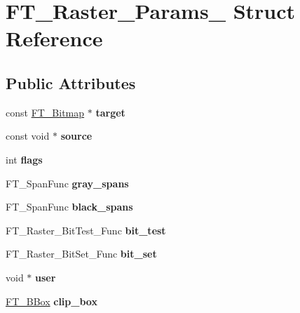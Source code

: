 \hypertarget{struct_f_t___raster___params__}{}\section{F\+T\+\_\+\+Raster\+\_\+\+Params\+\_\+ Struct Reference}
\label{struct_f_t___raster___params__}
\subsection*{Public Attributes}
\begin{DoxyCompactItemize}
\item 
\mbox{\label{struct_f_t___raster___params___a2ba8941740db23ec91302aa9bd154da3}} 
const \hyperlink{struct_f_t___bitmap__}{F\+T\+\_\+\+Bitmap} $\ast$ {\bfseries target}
\item 
\mbox{\label{struct_f_t___raster___params___a9be95865384791b018f7a9665a062ee5}} 
const void $\ast$ {\bfseries source}
\item 
\mbox{\label{struct_f_t___raster___params___a1a28ab69b8296b4378886d1a2b57d333}} 
int {\bfseries flags}
\item 
\mbox{\label{struct_f_t___raster___params___a456191f1944775933e3d9d36c8632c35}} 
F\+T\+\_\+\+Span\+Func {\bfseries gray\+\_\+spans}
\item 
\mbox{\label{struct_f_t___raster___params___a42c30e60ad5e243cf78833232e052b47}} 
F\+T\+\_\+\+Span\+Func {\bfseries black\+\_\+spans}
\item 
\mbox{\label{struct_f_t___raster___params___aff3c1a2a7eda24136a46715128d24ed6}} 
F\+T\+\_\+\+Raster\+\_\+\+Bit\+Test\+\_\+\+Func {\bfseries bit\+\_\+test}
\item 
\mbox{\label{struct_f_t___raster___params___ac66c3c44fcb63c254a46170d85d653c0}} 
F\+T\+\_\+\+Raster\+\_\+\+Bit\+Set\+\_\+\+Func {\bfseries bit\+\_\+set}
\item 
\mbox{\label{struct_f_t___raster___params___af78bac59f93c989840bbcbcbefd77c55}} 
void $\ast$ {\bfseries user}
\item 
\mbox{\label{struct_f_t___raster___params___ab32f75f19d9cacb20e410886c055e306}} 
\hyperlink{struct_f_t___b_box__}{F\+T\+\_\+\+B\+Box} {\bfseries clip\+\_\+box}
\end{DoxyCompactItemize}



